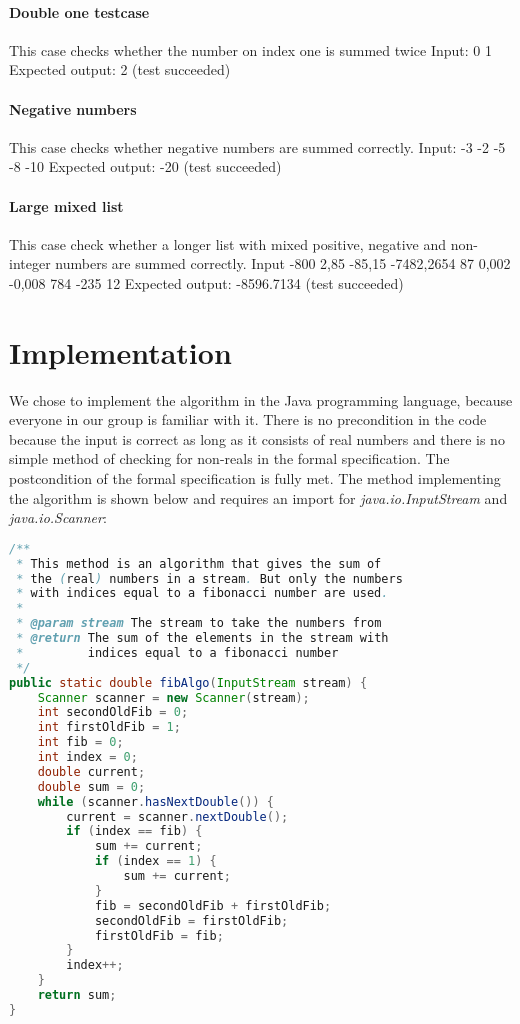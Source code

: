 \documentclass[12pt]{article}
\begin{document}
\paragraph{Double one testcase}
This case checks whether the number on index one is summed twice
Input: {0 1}
Expected output: 2 (test succeeded)

\paragraph{Negative numbers}
This case checks whether negative numbers are summed correctly.
Input: {-3 -2 -5 -8 -10}
Expected output: -20 (test succeeded)

\paragraph{Large mixed list}
This case check whether a longer list with mixed positive, negative and non-integer numbers are summed correctly.
Input {-800 2,85 -85,15 -7482,2654 87 0,002 -0,008 784 -235 12}
Expected output: -8596.7134 (test succeeded)

\section{Implementation}
We chose to implement the algorithm in the Java programming language, because everyone in our group is familiar with it. There is no precondition in the code because the input is correct as long as it consists of real numbers and there is no simple method of checking for non-reals in the formal specification. The postcondition of the formal specification is fully met. The method implementing the algorithm is shown below and requires an import for \textsl{java.io.InputStream} and \textsl{java.io.Scanner}:

\begin{lstlisting}[language=java]
/**
 * This method is an algorithm that gives the sum of
 * the (real) numbers in a stream. But only the numbers 
 * with indices equal to a fibonacci number are used.
 *
 * @param stream The stream to take the numbers from
 * @return The sum of the elements in the stream with
 *         indices equal to a fibonacci number
 */
public static double fibAlgo(InputStream stream) {
    Scanner scanner = new Scanner(stream);
    int secondOldFib = 0;
    int firstOldFib = 1;
    int fib = 0;
    int index = 0;
    double current;
    double sum = 0;
    while (scanner.hasNextDouble()) {
        current = scanner.nextDouble();
        if (index == fib) {
            sum += current;
            if (index == 1) {
                sum += current;
            }
            fib = secondOldFib + firstOldFib;
            secondOldFib = firstOldFib;
            firstOldFib = fib;
        }
        index++;
    }
    return sum;
}
\end{lstlisting}
\end{document}
